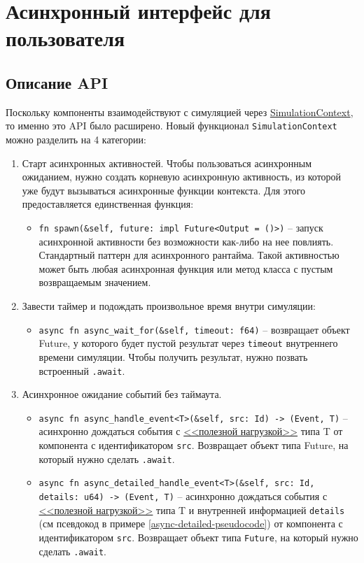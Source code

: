 \section{Асинхронный интерфейс для пользователя} \label{interface}

\subsection{Описание API}

Поскольку компоненты взаимодействуют с симуляцией через \hyperref[SimulationContext]{SimulationContext}, то именно это API было расширено. Новый функционал \texttt{SimulationContext} можно разделить на 4 категории: 
\begin{enumerate}
    \item Старт асинхронных активностей. Чтобы пользоваться асинхронным ожиданием, нужно создать корневую асинхронную активность, из которой уже будут вызываться асинхронные функции контекста. Для этого предоставляется единственная функция: 
    \begin{itemize}
        \item \texttt{fn spawn(\&self, future: impl Future<Output = ()>)} -- запуск асинхронной активности без возможности как-либо на нее повлиять. Стандартный паттерн для асинхронного рантайма. Такой активностью может быть любая асинхронная функция или метод класса с пустым возвращаемым значением. \label{spawn}
    \end{itemize}
    \item Завести таймер и подождать произвольное время внутри симуляции: 
    \begin{itemize}
        \item \texttt{async fn async\_wait\_for(\&self, timeout: f64)} -- возвращает объект Future, у которого будет пустой результат через \texttt{timeout} внутреннего времени симуляции. Чтобы получить результат, нужно позвать встроенный \texttt{.await}.
    \end{itemize}
    \item Асинхронное ожидание событий без таймаута. 
    \begin{itemize}
        \item \texttt{async fn async\_handle\_event<T>(\&self, src: Id) -> (Event, T)} -- асинхронно дождаться события с \hyperref[Event:payload]{<<полезной нагрузкой>>} типа T от компонента с идентификатором \texttt{src}. Возвращает объект типа Future, на который нужно сделать \texttt{.await}.
        \item \texttt{async fn async\_detailed\_handle\_event<T>(\&self, src: Id, details: u64) -> (Event, T)} -- асинхронно дождаться события с \hyperref[Event:payload]{<<полезной нагрузкой>>} типа T и внутренней информацией \texttt{details} (см псевдокод в примере \ref{async-detailed-pseudocode}) от компонента с идентификатором \texttt{src}. Возвращает объект типа \texttt{Future}, на который нужно сделать \texttt{.await}.

\end{itemize}
\end{enumerate}
